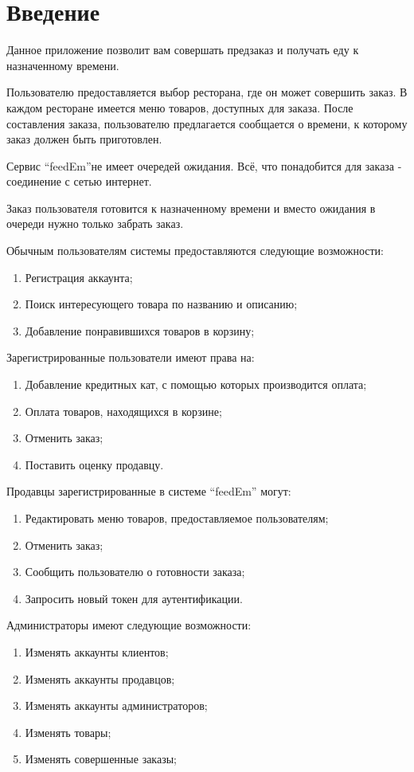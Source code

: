 \section*{Введение}
{
 Данное приложение позволит вам совершать предзаказ и получать еду к назначенному времени.

Пользователю предоставляется выбор ресторана, где он может совершить заказ. В каждом ресторане имеется меню товаров, доступных для заказа. После составления заказа, пользователю предлагается сообщается о времени, к которому заказ должен быть приготовлен.

Сервис \enquote{feedEm}не имеет очередей ожидания. Всё, что понадобится для заказа - соединение с сетью интернет.

Заказ пользователя готовится к назначенному времени и вместо ожидания в очереди нужно только забрать заказ.

 Обычным пользователям системы предоставляются следующие возможности:
 \begin{enumerate}
     \item {Регистрация аккаунта;}
     \item {Поиск интересующего товара по названию и описанию;}
     \item {Добавление понравившихся товаров в корзину;}
 \end{enumerate}
Зарегистрированные пользователи имеют права на:
 \begin{enumerate}
     \item{Добавление кредитных кат, с помощью которых производится оплата;}
     \item{Оплата товаров, находящихся в корзине;}
     \item{Отменить заказ;}
     \item{Поставить оценку продавцу.}
 \end{enumerate}
Продавцы зарегистрированные в системе \enquote{feedEm} могут:
 \begin{enumerate}
     \item{Редактировать меню товаров, предоставляемое пользователям;}
     \item{Отменить заказ;}
     \item{Сообщить пользователю о готовности заказа;}
     \item{Запросить новый токен для аутентификации.}
 \end{enumerate}
Администраторы имеют следующие возможности:
 \begin{enumerate}
     \item {Изменять аккаунты клиентов;}
     \item {Изменять аккаунты продавцов;}
     \item {Изменять аккаунты администраторов;}
     \item {Изменять товары;}
     \item {Изменять совершенные заказы;}
 \end{enumerate}
}
\newpage


